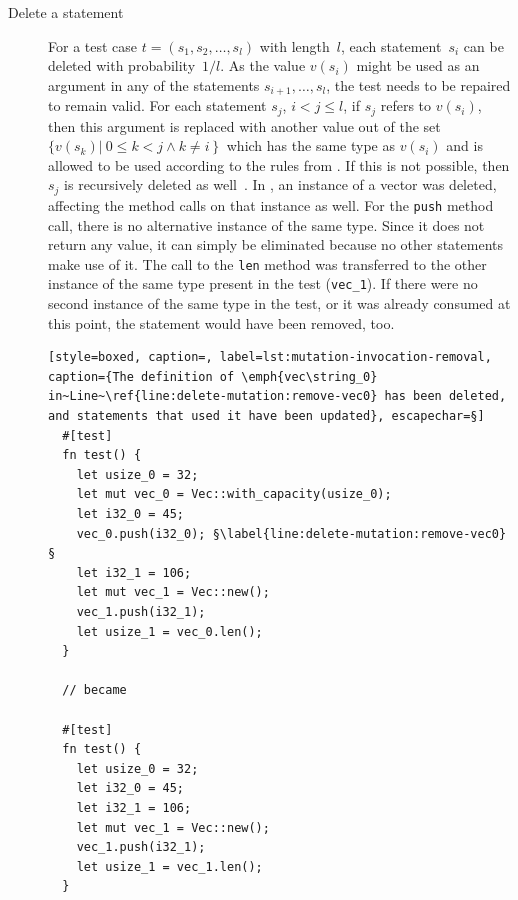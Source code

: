 \documentclass[paper=a4,%
  twoside,%
  BCOR4mm,%
  abstract=true,%
  toc=bibliography,%
  chapterprefix=true,%
  toc=bibliographynumbered,%
  open=right,%
  english,%
  pagesize=pdftex]{scrreprt}
\begin{document}
\begin{description}
  \item[Delete a statement] For a test case $t = (s_1, s_2, \dots, s_l)$ with length~$l$, each statement~$s_i$ can be deleted with probability~$1/l$. As the value $v(s_i)$ might be used as an argument in any of the statements $s_{i+1}, \dots, s_l$, the test needs to be repaired to remain valid. For each statement $s_j$, $i < j \leq l$, if $s_j$ refers to $v(s_i)$, then this argument is replaced with another value out of the set $\{v(s_k) \left|~0 \leq k < j \wedge k \neq i \right\}$ which has the same type as $v(s_i)$ and is allowed to be used according to the rules from . If this is not possible, then $s_j$ is recursively deleted as well~\cite{Fraser2012}. In , an instance of a vector was deleted, affecting the method calls on that instance as well. For the \texttt{push} method call, there is no alternative instance of the same type. Since it does not return any value, it can simply be eliminated because no other statements make use of it. The call to the \texttt{len} method was transferred to the other instance of the same type present in the test (\texttt{vec\string_1}). If there were no second instance of the same type in the test, or it was already consumed at this point, the statement would have been removed, too.

  \begin{lstlisting}[style=boxed, caption=, label=lst:mutation-invocation-removal, caption={The definition of \emph{vec\string_0} in~Line~\ref{line:delete-mutation:remove-vec0} has been deleted, and statements that used it have been updated}, escapechar=§]
  #[test]
  fn test() {
    let usize_0 = 32;
    let mut vec_0 = Vec::with_capacity(usize_0);
    let i32_0 = 45;
    vec_0.push(i32_0); §\label{line:delete-mutation:remove-vec0}§
    let i32_1 = 106;
    let mut vec_1 = Vec::new();
    vec_1.push(i32_1);
    let usize_1 = vec_0.len();
  }

  // became

  #[test]
  fn test() {
    let usize_0 = 32;
    let i32_0 = 45;
    let i32_1 = 106;
    let mut vec_1 = Vec::new();
    vec_1.push(i32_1);
    let usize_1 = vec_1.len();
  }
  \end{lstlisting}

\end{description}
\end{document}
